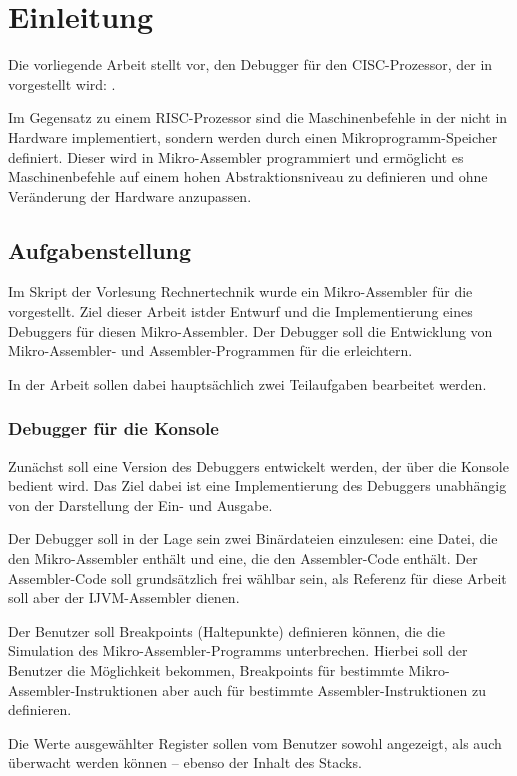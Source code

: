 \chapter*{Einleitung}
Die vorliegende Arbeit stellt \md{} vor, den Debugger für den CISC-Prozessor, der in \cite{Tanenbaum1998} vorgestellt wird: \mic.

Im Gegensatz zu einem RISC-Prozessor sind die Maschinenbefehle in der \mic{} nicht in Hardware implementiert, sondern werden durch einen Mikroprogramm-Speicher definiert. Dieser wird in Mikro-Assembler programmiert und ermöglicht es Maschinenbefehle auf einem hohen Abstraktionsniveau zu definieren und ohne Veränderung der Hardware anzupassen.

\section*{Aufgabenstellung}
Im Skript der Vorlesung Rechnertechnik  wurde ein Mikro-Assembler für die \mic{} vorgestellt. Ziel dieser Arbeit istder Entwurf und die Implementierung eines Debuggers für diesen Mikro-Assembler. Der Debugger soll die Entwicklung von Mikro-Assembler- und Assembler-Programmen für die \mic{} erleichtern.

In der Arbeit sollen dabei hauptsächlich zwei Teilaufgaben bearbeitet werden.

\subsection*{Debugger für die Konsole}
Zunächst soll eine Version des Debuggers entwickelt werden, der über die Konsole bedient wird. Das Ziel dabei ist eine Implementierung des Debuggers unabhängig von der Darstellung der Ein- und Ausgabe.

Der Debugger soll in der Lage sein zwei Binärdateien einzulesen: eine Datei, die den Mikro-Assembler enthält und eine, die den Assembler-Code enthält. Der Assembler-Code soll grundsätzlich frei wählbar sein, als Referenz für diese Arbeit soll aber der IJVM-Assembler dienen.

Der Benutzer soll Breakpoints (Haltepunkte) definieren können, die die Simulation des Mikro-Assembler-Programms unterbrechen. Hierbei soll der Benutzer die Möglichkeit bekommen, Breakpoints für bestimmte Mikro-Assembler-Instruktionen aber auch für bestimmte Assembler-Instruktionen zu definieren.

Die Werte ausgewählter Register sollen vom Benutzer sowohl angezeigt, als auch überwacht werden können -- ebenso der Inhalt des Stacks.


